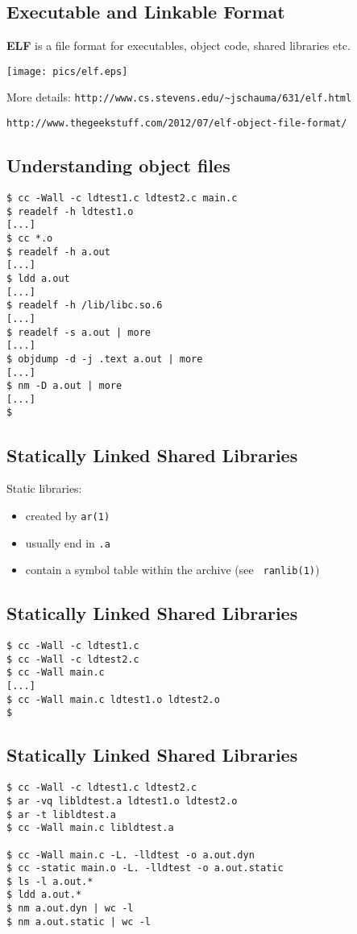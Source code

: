 \documentclass[xga]{xdvislides}
\begin{document}
\subsection{Executable and Linkable Format}

{\bf ELF} is a file format for executables, object code, shared libraries
etc.

\begin{center}
	\texttt{[image: pics/elf.eps]}
\end{center}
More details:
\verb+http://www.cs.stevens.edu/~jschauma/631/elf.html+

\verb+http://www.thegeekstuff.com/2012/07/elf-object-file-format/+
\Normalsize


\subsection{Understanding object files}
\begin{verbatim}
$ cc -Wall -c ldtest1.c ldtest2.c main.c
$ readelf -h ldtest1.o
[...]
$ cc *.o
$ readelf -h a.out
[...]
$ ldd a.out
[...]
$ readelf -h /lib/libc.so.6
[...]
$ readelf -s a.out | more
[...]
$ objdump -d -j .text a.out | more
[...]
$ nm -D a.out | more
[...]
$
\end{verbatim}

\subsection{Statically Linked Shared Libraries}
Static libraries:
\begin{itemize}
	\item created by {\tt ar(1)}
	\item usually end in {\tt .a}
	\item contain a symbol table within the archive (see {\tt
		ranlib(1)})
\end{itemize}

\subsection{Statically Linked Shared Libraries}
\begin{verbatim}
$ cc -Wall -c ldtest1.c
$ cc -Wall -c ldtest2.c
$ cc -Wall main.c
[...]
$ cc -Wall main.c ldtest1.o ldtest2.o
$
\end{verbatim}

\subsection{Statically Linked Shared Libraries}
\begin{verbatim}
$ cc -Wall -c ldtest1.c ldtest2.c
$ ar -vq libldtest.a ldtest1.o ldtest2.o
$ ar -t libldtest.a
$ cc -Wall main.c libldtest.a

$ cc -Wall main.c -L. -lldtest -o a.out.dyn
$ cc -static main.o -L. -lldtest -o a.out.static
$ ls -l a.out.*
$ ldd a.out.*
$ nm a.out.dyn | wc -l
$ nm a.out.static | wc -l
\end{verbatim}
\end{document}
